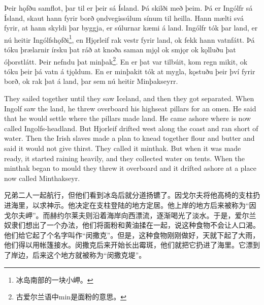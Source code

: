 \begin{paracol}{2}
    Þeir hǫfðu samflot, þar til er þeir sá Ísland. Þá skilði með þeim. Þá er Ingólfr sá Ísland, skaut hann fyrir borð ǫndvegissúlum sínum til heilla. Hann mælti svá fyrir, at hann skyldi þar byggja, er súlurnar kæmi á land. Ingólfr tók þar land, er nú heitir Ingólfshǫfði\footnote{冰岛南部的一块小岬。}, en Hjǫrleif rak vestr fyrir land, ok fekk hann vatnfátt. Þá tóku þrælarnir írsku þat ráð at knoða saman mjǫl ok smjǫr ok kǫlluðu þat óþorstlátt. Þeir nefndu þat minþak\footnote{古爱尔兰语中min是面粉的意思。}. En er þat var tilbúit, kom regn mikit, ok tóku þeir þá vatn á tjǫldum. En er minþakit tók at mygla, kǫstuðu þeir því fyrir borð, ok rak þat á land, þar sem nú heitir Minþakseyrr.

    \switchcolumn

    They sailed together until they saw Iceland, and then they got separated. When Ingolf saw the land, he threw overboard his highseat pillars for an omen. He said that he would settle where the pillars made land. He came ashore where is now called Ingolfs-headland. But Hjorleif drifted west along the coast and ran short of water. Then the Irish slaves made a plan to knead together flour and butter and said it would not give thirst. They called it minthak. But when it was made ready, it started raining heavily, and they collected water on tents. When the minthak began to mould they threw it overboard and it drifted ashore at a place now called Minthakseyr.
\end{paracol}
\begin{translation*}{}
    兄弟二人一起航行，但他们看到冰岛后就分道扬镳了。因戈尔夫将他高椅的支柱扔进海里，以求神示。他决定在支柱登陆的地方定居。他上岸的地方后来被称为“因戈尔夫岬”。而赫约尔莱夫则沿着海岸向西漂流，逐渐喝光了淡水。于是，爱尔兰奴隶们想出了一个办法，他们将面粉和黄油揉在一起，说这种食物不会让人口渴。他们给它起了个名字叫作“闵撒克”。但是，这种食物刚刚做好，天就下起了大雨，他们得以用帐篷接水。闵撒克后来开始长出霉斑，他们就把它扔进了海里。它漂到了岸边，后来这个地方就被称为“闵撒克堤”。
\end{translation*}

